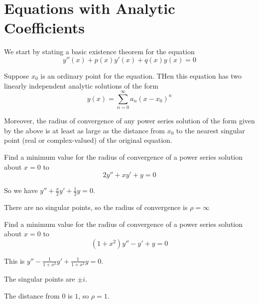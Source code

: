\documentclass[../diffeq.tex]{subfiles}
\begin{document}
\section{Equations with Analytic Coefficients}
We start by stating a basic existence theorem for the equation 
\[ y''(x)+p(x)y'(x)+q(x)y(x)=0\]

\begin{theorem}
    Suppose $x_0$ is an ordinary point for the equation. THen this equation has two linearly independent analytic solutions of the form 
    \[ y(x)=\sum_{n=0}^{\infty}a_n(x-x_0)^n \]

    Moreover, the radius of convergence of any power series solution of the form given by the above is at least as large as the distance from $x_0$ to the nearest singular point (real or complex-valued) of the original equation.
\end{theorem}

\begin{example}
    Find a minimum value for the radius of convergence of a power series solution about $x=0$ to 
    \[ 2y''+xy'+y=0 \]

    So we have $y''+\frac{x}{2}y'+\frac{1}{2}y=0$.

    There are no singular points, so the radius of convergence is $\rho = \infty$
\end{example}

\begin{example}
    Find a minimum value for the radius of convergence of a power series solution about $x=0$ to 
    \[ (1+x^2)y''-y'+y=0 \]

    This is $y''-\frac{1}{1+x^2}y'+\frac{1}{1+x^2}y=0$.

    The singular points are $\pm i$.

    The distance from $0$ is $1$, so $\rho = 1$.
\end{example}
\end{document}
